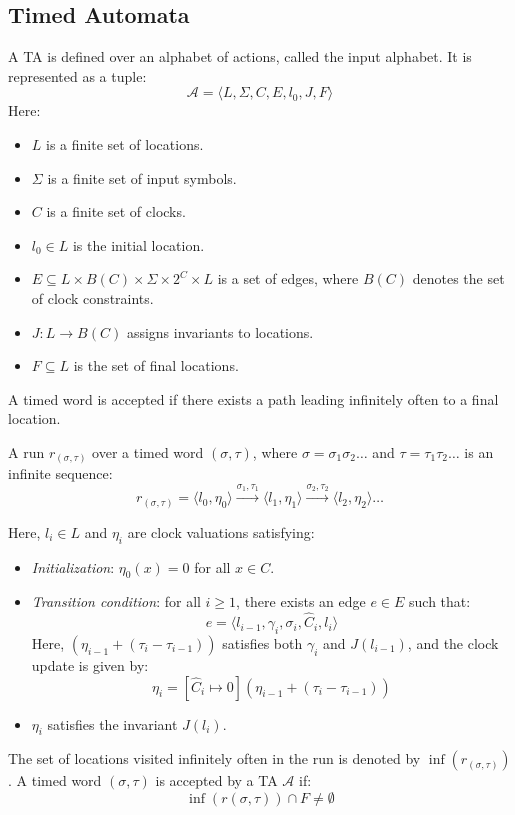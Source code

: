 \subsection{Timed Automata}
A TA is defined over an alphabet of actions, called the input alphabet. 
It is represented as a tuple:
\[\mathcal{A} = \langle L, \Sigma, C, E, l_0, J, F \rangle\]
\noindent Here:
\begin{itemize}
    \item $L$ is a finite set of locations.
    \item $\Sigma$ is a finite set of input symbols.
    \item $C$ is a finite set of clocks.
    \item $l_0 \in L$ is the initial location.
    \item $E \subseteq L \times B(C) \times \Sigma \times 2^C \times L$ is a set of edges, where $B(C)$ denotes the set of clock constraints.
    \item $J: L \to B(C)$ assigns invariants to locations.
    \item $F \subseteq L$ is the set of final locations.
\end{itemize}
\noindent A timed word is accepted if there exists a path leading infinitely often to a final location.

\begin{definition}
    A run $r_{(\sigma, \tau)}$ over a timed word $(\sigma, \tau)$, where $\sigma = \sigma_1 \sigma_2 \dots$ and $\tau = \tau_1 \tau_2 \dots$ is an infinite sequence:
    \[r_{(\sigma, \tau)} = \langle l_0, \eta_0 \rangle \xrightarrow{\sigma_1, \tau_1} \langle l_1, \eta_1 \rangle \xrightarrow{\sigma_2, \tau_2} \langle l_2, \eta_2 \rangle \dots\]
\end{definition}

Here, $l_i \in L$ and $\eta_i$ are clock valuations satisfying:
\begin{itemize}
    \item \textit{Initialization}: $\eta_0(x) = 0$ for all $x \in C$.
    \item \textit{Transition condition}: for all $i \geq 1$, there exists an edge $e \in E$ such that:
        \[e = \langle l_{i-1}, \gamma_i, \sigma_i, \hat{C}_i, l_i \rangle\]
        Here, $(\eta_{i-1} + (\tau_i - \tau_{i-1}))$ satisfies both $\gamma_i$ and $J(l_{i-1})$, and the clock update is given by:
        \[\eta_i = [\hat{C}_i \mapsto  0](\eta_{i-1} + (\tau_i - \tau_{i-1}))\]
    \item $\eta_i$ satisfies the invariant $J(l_i)$.
\end{itemize}
\noindent The set of locations visited infinitely often in the run is denoted by $\inf(r_{(\sigma, \tau)})$.
A timed word $(\sigma, \tau)$ is accepted by a TA $\mathcal{A}$ if:
\[\inf(r(\sigma, \tau)) \cap F \neq \emptyset\]

